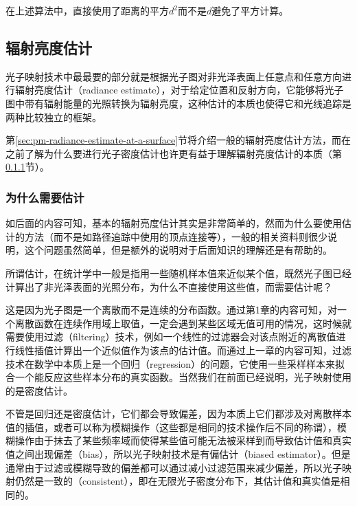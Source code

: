 在上述算法中，直接使用了距离的平方$d^2$而不是$d$避免了平方计算。





\subsection{辐射亮度估计}\label{sec:pm-radiance-estimate}
光子映射技术中最最要的部分就是根据光子图对非光泽表面上任意点和任意方向进行辐射亮度估计（radiance estimate），对于给定位置和反射方向，它能够将光子图中带有辐射能量的光照转换为辐射亮度，这种估计的本质也使得它和光线追踪是两种比较独立的框架。

第\ref{sec:pm-radiance-estimate-at-a-surface}节将介绍一般的辐射亮度估计方法，而在之前了解为什么要进行光子密度估计也许更有益于理解辐射亮度估计的本质（第\ref{sec:pm-why-radiance-estimate}节）。




\subsubsection{为什么需要估计}\label{sec:pm-why-radiance-estimate}
如后面的内容可知，基本的辐射亮度估计其实是非常简单的，然而为什么要使用估计的方法（而不是如路径追踪中使用的顶点连接等），一般的相关资料则很少说明，这个问题虽然简单，但是额外的说明对于后面知识的理解还是有帮助的。

所谓估计，在统计学中一般是指用一些随机样本值来近似某个值，既然光子图已经计算出了非光泽表面的光照分布，为什么不直接使用这些值，而需要估计呢？

这是因为光子图是一个离散而不是连续的分布函数。通过第1章的内容可知，对一个离散函数在连续作用域上取值，一定会遇到某些区域无值可用的情况，这时候就需要使用过滤（filtering）技术，例如一个线性的过滤器会对该点附近的离散值进行线性插值计算出一个近似值作为该点的估计值。而通过上一章的内容可知，过滤技术在数学中本质上是一个回归（regression）的问题，它使用一些采样样本来拟合一个能反应这些样本分布的真实函数。当然我们在前面已经说明，光子映射使用的是密度估计。

不管是回归还是密度估计，它们都会导致偏差，因为本质上它们都涉及对离散样本值的插值，或者可以称为模糊操作（这些都是相同的技术操作后不同的称谓），模糊操作由于抹去了某些频率域而使得某些值可能无法被采样到而导致估计值和真实值之间出现偏差（bias），所以光子映射技术是有偏估计（biased estimator）。但是通常由于过滤或模糊导致的偏差都可以通过减小过滤范围来减少偏差，所以光子映射仍然是一致的（consistent），即在无限光子密度分布下，其估计值和真实值是相同的。






